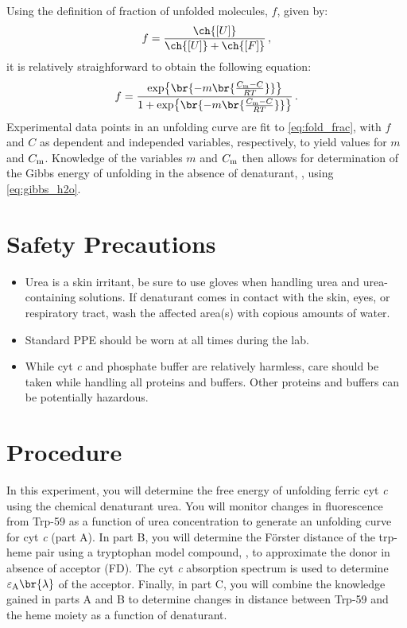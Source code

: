 \documentclass[nobib,nofonts,nols,nohyper]{tufte-handout}
\begin{document}
Using the definition of fraction of unfolded molecules, \( f \), given by:
\begin{equation}
  f = \frac{\ch{[U]}}{\ch{[U]} + \ch{[F]}} \, ,
  \label{eq:conc_frac}
\end{equation}
it is relatively straighforward to obtain the following equation:
\begin{equation}
  f = \frac{ \exp\br{ -m \br{\frac{C_\mtext{m} - C}{RT}}}}{1 + \exp\br{-m \br{\frac{C_\mtext{m} - C}{RT}}}} \, .
  \label{eq:fold_frac}
\end{equation}
Experimental data points in an unfolding curve are fit to \cref{eq:fold_frac}, with \( f \) and \( C \) as dependent and independed variables, respectively, to yield values for \( m \) and \( C_{\textnormal{m}} \). 
Knowledge of the variables \( m \) and \( C_{\textnormal{m}} \) then allows for determination of the Gibbs energy of unfolding in the absence of denaturant, \gibbs*[subscript-right=\ch{H2O}], using \cref{eq:gibbs_h2o}.



\section{Safety Precautions} %
\label{sec:safety_precautions}

\begin{itemize}
  \item Urea is a skin irritant, be sure to use gloves when handling urea and urea-containing solutions. If denaturant comes in contact with the skin, eyes, or respiratory tract, wash the affected area(s) with copious amounts of water. 
  \item Standard PPE should be worn at all times during the lab. 
  \item While cyt \emph{c} and phosphate buffer are relatively harmless, care should be taken while handling all proteins and buffers. Other proteins and buffers can be potentially hazardous. 
\end{itemize}


\section{Procedure} %
\label{sec:procedure}

In this experiment, you will determine the free energy of unfolding ferric cyt \emph{c} using the chemical denaturant urea.  
You will monitor changes in fluorescence from Trp-59 as a function of urea concentration to generate an unfolding curve for cyt \emph{c} (part A).  
In part B, you will determine the Förster distance of the trp-heme pair using a tryptophan model compound, , to approximate the donor in absence of acceptor (FD).  
The cyt \emph{c} absorption spectrum is used to determine \( \varepsilon_\mtext{A} \br{\lambda} \) of the acceptor. 
Finally, in part C, you will combine the knowledge gained in parts A and B to determine changes in distance between Trp-59 and the heme moiety as a function of denaturant. 
\end{document}
